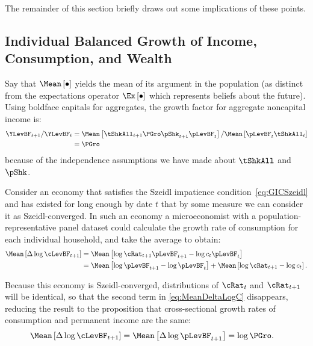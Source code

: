 \documentclass[ProjectDLO]{subfiles}
\begin{document}
The remainder of this section briefly draws out some implications of these points.

\hypertarget{Growth-Rates-of-Individual-Income-and-Consumption}{}
\subsection{Individual Balanced Growth of  Income, Consumption, and Wealth}\label{subsec:cGroEqPGroQ}

Say that $\Mean\left[\bullet\right]$ yields the mean of its argument in the population (as distinct from the expectations operator $\Ex\left[\bullet\right]$ which represents beliefs about the future).  Using boldface capitals for aggregates, the growth factor for aggregate noncapital income is:
\begin{align*}
    \YLevBF_{t+1}/\YLevBF_{t}  & = \Mean\left[\tShkAll_{t+1}\PGro \pShk_{t+1}\pLevBF_{t}\right]/\Mean\left[\pLevBF_{t}\tShkAll_{t}\right]  \\
    & = \PGro
\end{align*}
because of the independence assumptions we have made about $\tShkAll$ and $\pShk$.

Consider an economy that satisfies the Szeidl impatience condition~\eqref{eq:GICSzeidl} and has existed for long enough by date $t$ that by some measure we can consider it as Szeidl-converged.  In such an economy a microeconomist with a population-representative panel dataset could calculate the growth rate of consumption for each individual household, and take the average to obtain:
\begin{align}
    \Mean\left[\Delta \log \cLevBF_{t+1}\right]  & = \Mean\left[ \log {\cRat}_{t+1}\pLevBF_{t+1} - \log c_{t}\pLevBF_{t}\right]  \notag \\
    & = \Mean\left[ \log \pLevBF_{t+1}- \log \pLevBF_{t}\right] + \Mean\left[ \log {\cRat}_{t+1} - \log c_{t}\right] \label{eq:MeanDeltaLogC}.
\end{align}

Because this economy is Szeidl-converged, distributions of $\cRat_{t}$ and $\cRat_{t+1}$ will be identical, so that the second term in  \eqref{eq:MeanDeltaLogC} disappears, reducing the result to the proposition that cross-sectional growth rates of consumption and permanent income are the same:
\begin{align}
    \Mean\left[\Delta \log \cLevBF_{t+1}\right]  & = \Mean\left[ \Delta \log \pLevBF_{t+1}\right] = \log \PGro \label{eq:MeanDeltaLogCeqMeanDeltaLogP}.
\end{align}
\end{document}
